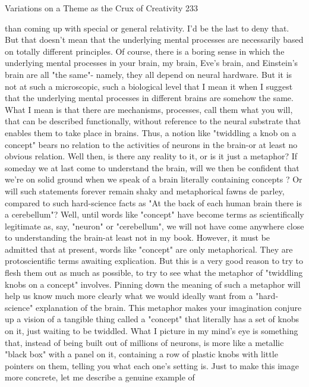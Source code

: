 Variations on a Theme as the Crux of Creativity                                        233

than coming up with special or general relativity. I'd be the last to deny that. But that
doesn't mean that the underlying mental processes are necessarily based on totally
different principles. Of course, there is a boring sense in which the underlying mental
processes in your brain, my brain, Eve's brain, and Einstein's brain are all "the same"-
namely, they all depend on neural hardware. But it is not at such a microscopic, such
a biological level that I mean it when I suggest that the underlying mental processes in
different brains are somehow the same. What I mean is that there are mechanisms,
processes, call them what you will, that can be described functionally, without
reference to the neural substrate that enables them to take place in brains.
         Thus, a notion like "twiddling a knob on a concept" bears no relation to the
activities of neurons in the brain-or at least no obvious relation. Well then, is there
any reality to it, or is it just a metaphor? If someday we at last come to understand the
brain, will we then be confident that we're on solid ground when we speak of a brain
literally containing concepts ? Or will such statements forever remain shaky and
metaphorical fawns de parley, compared to such hard-science facts as "At the back of
each human brain there is a cerebellum"? Well, until words like "concept" have
become terms as scientifically legitimate as, say, "neuron" or "cerebellum", we will
not have come anywhere close to understanding the brain-at least not in my book.
         However, it must be admitted that at present, words like "concept" are only
metaphorical. They are protoscientific terms awaiting explication. But this is a very
good reason to try to flesh them out as much as possible, to try to see what the
metaphor of "twiddling knobs on a concept" involves. Pinning down the meaning of
such a metaphor will help us know much more clearly what we would ideally want
from a "hard-science" explanation of the brain.
         This metaphor makes your imagination conjure up a vision of a tangible thing
called a "concept" that literally has a set of knobs on it, just waiting to be twiddled.
What I picture in my mind's eye is something that, instead of being built out of
millions of neurons, is more like a metallic "black box" with a panel on it, containing
a row of plastic knobs with little pointers on them, telling you what each one's setting
is.
         Just to make this image more concrete, let me describe a genuine example of
